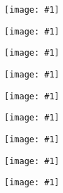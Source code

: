 \documentclass[english, 12 pt]{report}
\newcommand{\fig}[1]{
\begin{figure}[h]
	\texttt{[image: \#1]}
	\centering
\end{figure}
}
\begin{document}
\pagestyle{empty}
\fig{fig1}
\fig{fig2}
\fig{fig3}
\fig{fig4}
\fig{fig5}
\fig{fig6}
\fig{fig7}
\fig{fig8}
\fig{fig9}
\end{document}
